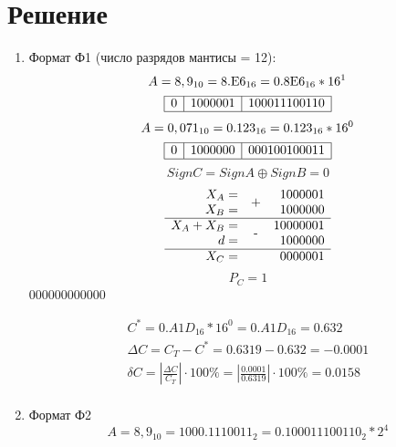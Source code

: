 \documentclass{article}
\begin{document}
\section{Решение}
\begin{enumerate}
       \item Формат Ф1 (число разрядов мантисы = 12):
             $$ A = 8,9_{10} = \textmd{8.E6}_{16} = \textmd{0.8E6}_{16} * 16^1 $$
             $$
                    \begin{array}{|c|c|c|}
                           \hline        
                           0 & 1000001 & 100011100110 \\\hline
                    \end{array}
             $$
             $$ A = 0,071_{10} = \textmd{0.123}_{16} = \textmd{0.123}_{16} * 16^0 $$
             $$
                    \begin{array}{|c|c|c|}
                           \hline        
                           0 & 1000000 & 000100100011 \\\hline
                    \end{array}
             $$
             $$ SignC = SignA \oplus SignB = 0 $$
             $$
                    \begin{array}{rcr}
                           X_A         = & \PLUS  & 1000001         \\
                           X_B         = &        & 1000000 \nl
                           X_A + X_B   = & \MINUS & 10000001        \\
                           d           = &        & 1000000     \nl
                           X_C         = &        & 0000001
                    \end{array}
             $$
             $$ P_C = 1 $$
             000000000000
             
             $$
                    \begin{array}{c}
                           C^* = 0.A1D_{16} * 16^0 = 0.A1D_{16}  = 0.632\\
                           \Delta C = C_T - C^* = 0.6319 - 0.632 = -0.0001 \\
                           \delta C = \left|\frac{\Delta C}{C_T}\right| \cdot 100\% = \left|\frac{0.0001}{0.6319}\right| \cdot 100\% = 0.0158 \\
                    \end{array}
             $$
       \item Формат Ф2
              $$ A = 8,9_{10} = 1000.1110011_{2} = 0.100011100110_{2} * 2^4 $$
              $$
                     \begin{array}{|c|c|c|}

\end{array}$$
\end{enumerate}
\end{document}
